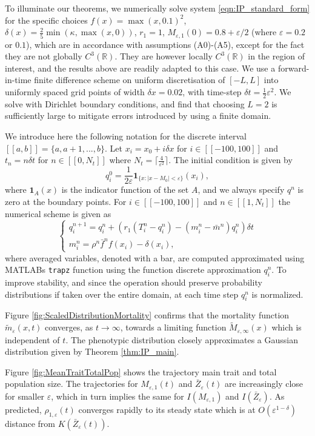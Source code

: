 \documentclass[]{article}
\theoremstyle{remark}
\begin{document}
To illuminate our theorems, we numerically solve system \eqref{eqn:IP_standard_form} for the specific choices $f(x)=\max(x,0.1)^2$, $\delta(x)=\frac{2}{5}\min(\kappa,\max(x,0))$, $r_1=1$, $M_{\varepsilon,1}(0)=0.8+\varepsilon/2$ (where $\varepsilon=0.2$ or $0.1$), which are in accordance with assumptions (A0)-(A5), except for the fact they are not globally $C^3(\mathbb{R})$. They are however locally $C^{3}(\mathbb{R})$ in the region of interest, and the results above are readily adapted to this case. We use a forward-in-time finite difference scheme on uniform discretisation of $[-L,L]$ into uniformly spaced grid points of width $\delta{x}=0.02$, with time-step $\delta{t}=\frac{1}{2}\varepsilon^2$. We solve with Dirichlet boundary conditions, and find that choosing $L=2$ is sufficiently large to mitigate errors introduced by using a finite domain. 


We introduce here the following notation for the discrete interval $[[a,b]]=\{a,a+1,...,b\}$. Let  $x_i=x_0+i\delta{x}$ for $i\in[[-100,100]]$ and $t_n=n\delta{}t$ for $n\in[[0,N_t]]$ where $N_t=\lceil\frac{4}{\varepsilon^2}\rceil$. The initial condition is given by 
\[q_i^0=\frac{1}{2\varepsilon}\mathbf{1}_{\{x: |x-M_0|<\varepsilon\}}(x_i),\]
where $\mathbf{1}_{A}(x)$ is the indicator function of the set $A$, and we always specify $q^n$ is zero at the boundary points. For $i\in[[-100,100]]$ and $n\in[[1,N_t]]$ the numerical scheme is given as
\[\begin{cases}
q_i^{n+1}=q_i^n+(r_1{}(T^{n}_i-q_i^n)-(m_i^n-\bar{m}^n)q_i^n)\delta{t}\\
m_{i}^n=\rho^n\bar{f}^nf(x_i)-\delta(x_i),
\end{cases}\]
where averaged variables, denoted with a bar, are computed approximated using MATLABs \texttt{trapz} function using the function discrete approximation $q_i^n$. To improve stability, and since the operation should preserve probability distributions if taken over the entire domain, at each time step $q_i^n$ is normalized.



Figure \ref{fig:ScaledDistributionMortality} confirms that the mortality function $\tilde{m}_\varepsilon(x,t)$ converges, as $t\rightarrow\infty$, towards a limiting function $\widetilde{M}_{\varepsilon,\infty}
(x)$ which is independent of $t$. The phenotypic distribution closely approximates a Gaussian distribution given by Theorem \ref{thm:IP_main}.

Figure \ref{fig:MeanTraitTotalPop} shows the trajectory main trait and total population size. The trajectories for $M_{\varepsilon,1}(t)$ and $\bar{Z}_\varepsilon(t)$ are increasingly close for smaller $\varepsilon$, which in turn implies the same for $I(M_{\varepsilon,1})$ and $I(\bar{Z}_\varepsilon)$. As predicted, $\rho_{1,\varepsilon}(t)$ converges rapidly to its steady state which is at $O(\varepsilon^{1-\delta})$ distance from $K(\bar{Z}_\varepsilon(t))$.
\end{document}

